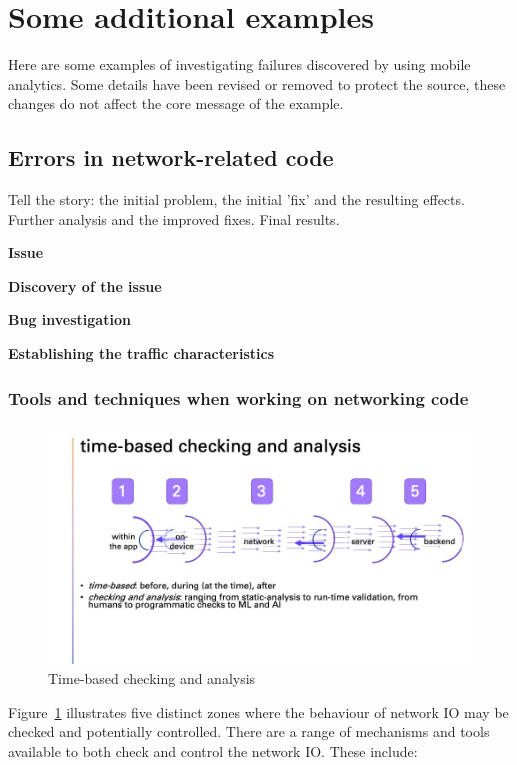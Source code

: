 \section{Some additional examples}
Here are some examples of investigating failures discovered by using mobile analytics. Some details have been revised or removed to protect the source, these changes do not affect the core message of the example.

\subsection{Errors in network-related code}

Tell the story: the initial problem, the initial 'fix' and the resulting effects. Further analysis and the improved fixes. Final results.

\textbf{Issue}

\textbf{Discovery of the issue}

\textbf{Bug investigation}

\textbf{Establishing the traffic characteristics}

\subsubsection{Tools and techniques when working on networking code}

\begin{figure}
    \centering
    \includegraphics[width=15cm]{images/my/time-based-checking-and-analysis.jpg}
    \caption{Time-based checking and analysis}
    \label{fig:my_timebased-checking-and-analysis}
\end{figure}

Figure~\ref{fig:my_timebased-checking-and-analysis} illustrates five distinct zones where the behaviour of network IO may be checked and potentially controlled. There are a range of mechanisms and tools available to both check and control the network IO. These include:

